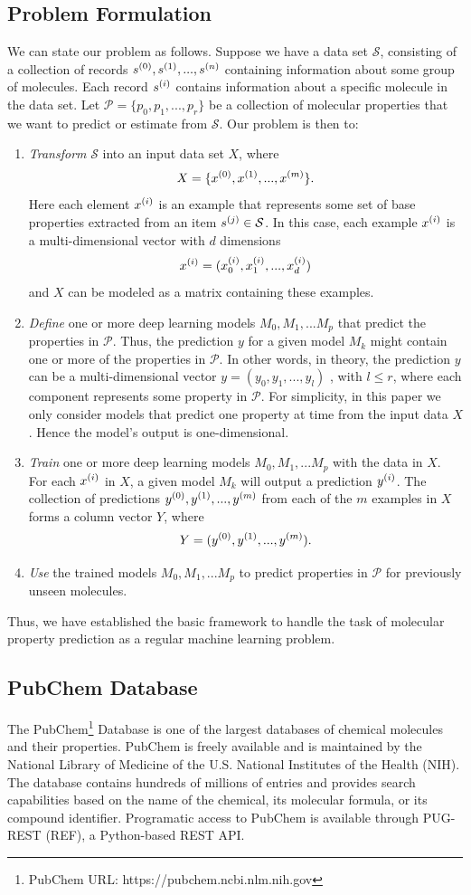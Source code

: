 \subsection{Problem Formulation}
We can state our problem as follows. Suppose we have a data set $\mathcal{S}$, consisting of a collection of records $s^{(0)}, s^{(1)}, ..., s^{(n)}$ containing information about some group of molecules. Each record $s^{(i)}$ contains information about a specific molecule in the data set. Let $\mathcal{P} = \{p_0, p_1, ..., p_r\}$ be a collection of molecular properties that we want to predict or estimate from $\mathcal{S}$.  Our problem is  then to: 
\begin{enumerate}
	\item {\em Transform} $\mathcal{S}$ into an input data set  $X$, where 
	\[X = \{x^{(0)}, x^{(1)}, ..., x^{(m)}\}.\] Here each element $x^{(i)}$ is an example that represents 
	some set of base properties extracted from an item $s^{(j)} \in  \mathcal{S}$. In this case, each example $x^{(i)}$ is a multi-dimensional vector with $d$ dimensions
	\[x^{(i)}=(x^{(i)}_0, x^{(i)}_1, ..., x^{(i)}_d)\] and 
	$X$ can be modeled as a matrix containing these examples.
	\item {\em Define} one or more deep learning models $M_0, M_1, ... M_p$ that predict the properties in $\mathcal{P}$. Thus, the prediction $y$ for a given model $M_k$ might contain one or more of the properties in $\mathcal{P}$. In other words, in theory, the prediction $y$ can be a multi-dimensional vector $y = (y_0, y_1, ..., y_l)$ , with $l \leq r$, where each component represents some property in $\mathcal{P}$. For simplicity, in this paper we only consider models that predict one property at time from the input data $X$. Hence the model's output is one-dimensional.
	\item {\em Train} one or more deep learning models $M_0, M_1, ... M_p$ with the data in $X$. For each $x^{(i)}$ in $X$, a given model $M_k$ will output a prediction $y^{(i)}$. The collection of predictions $y^{(0)}, y^{(1)}, ..., y^{(m)}$ from each of the $m$ examples in $X$ forms a column vector $Y$,  where
	\[ Y  = (y^{(0)}, y^{(1)}, ..., y^{(m)}).\] 
	\item {\em Use} the trained models $M_0, M_1, ... M_p$ to predict properties in $\mathcal{P}$ for previously unseen molecules. 
\end{enumerate}
Thus, we have established the basic framework to handle the task of molecular property prediction as a regular machine learning problem. 
\subsection{PubChem Database}
The PubChem\footnote{PubChem URL: https://pubchem.ncbi.nlm.nih.gov} Database is one of the largest databases of chemical molecules and their properties. PubChem is freely available and is maintained by the National Library of  Medicine of the U.S. National Institutes of the Health (NIH). The database contains hundreds of millions of entries and provides search capabilities based on the name of the chemical, its molecular formula, or its compound identifier.  Programatic access to  PubChem is available through PUG-REST (REF), a Python-based REST API. 

